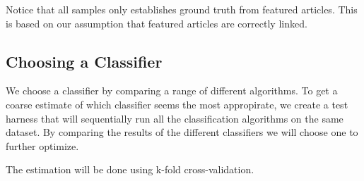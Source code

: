 Notice that all samples only establishes ground truth from featured articles. This is based on our assumption that featured articles are correctly linked.

\subsection{Choosing a Classifier}\label{choosing_classifier}
We choose a classifier by comparing a range of different algorithms. To get a coarse estimate of which classifier seems the most appropirate, we create a test harness that will sequentially run all the classification algorithms on the same dataset. By comparing the results of the different classifiers we will choose one to further optimize.

The estimation will be done using k-fold cross-validation.





